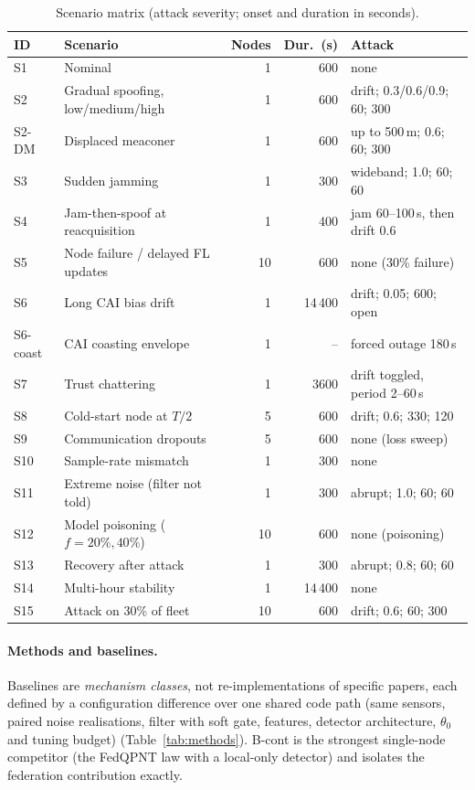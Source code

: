 \documentclass[12pt,a4paper]{article}
\begin{document}
\begin{table}[ht]
\centering
\caption{Scenario matrix (attack severity; onset and duration in seconds).}
\label{tab:scenarios}
\footnotesize
\begin{tabular}{llrrp{5.4cm}}
\toprule
ID & Scenario & Nodes & Dur.\ (s) & Attack \\
\midrule
S1 & Nominal & 1 & 600 & none \\
S2 & Gradual spoofing, low/medium/high & 1 & 600 & drift; 0.3/0.6/0.9; 60; 300 \\
S2-DM & Displaced meaconer & 1 & 600 & up to 500\,m; 0.6; 60; 300 \\
S3 & Sudden jamming & 1 & 300 & wideband; 1.0; 60; 60 \\
S4 & Jam-then-spoof at reacquisition & 1 & 400 & jam 60--100\,s, then drift 0.6 \\
S5 & Node failure / delayed FL updates & 10 & 600 & none (30\% failure) \\
S6 & Long CAI bias drift & 1 & 14\,400 & drift; 0.05; 600; open \\
S6-coast & CAI coasting envelope & 1 & -- & forced outage 180\,s \\
S7 & Trust chattering & 1 & 3600 & drift toggled, period 2--60\,s \\
S8 & Cold-start node at $T/2$ & 5 & 600 & drift; 0.6; 330; 120 \\
S9 & Communication dropouts & 5 & 600 & none (loss sweep) \\
S10 & Sample-rate mismatch & 1 & 300 & none \\
S11 & Extreme noise (filter not told) & 1 & 300 & abrupt; 1.0; 60; 60 \\
S12 & Model poisoning ($f{=}20\%,40\%$) & 10 & 600 & none (poisoning) \\
S13 & Recovery after attack & 1 & 300 & abrupt; 0.8; 60; 60 \\
S14 & Multi-hour stability & 1 & 14\,400 & none \\
S15 & Attack on 30\% of fleet & 10 & 600 & drift; 0.6; 60; 300 \\
\bottomrule
\end{tabular}
\end{table}

\paragraph{Methods and baselines.}
Baselines are \emph{mechanism classes}, not re-implementations of specific papers, each defined by a configuration difference over one shared code path (same sensors, paired noise realisations, filter with soft gate, features, detector architecture, $\theta_0$ and tuning budget) (Table~\ref{tab:methods}). B-cont is the strongest single-node competitor (the FedQPNT law with a local-only detector) and isolates the federation contribution exactly.
\end{document}
